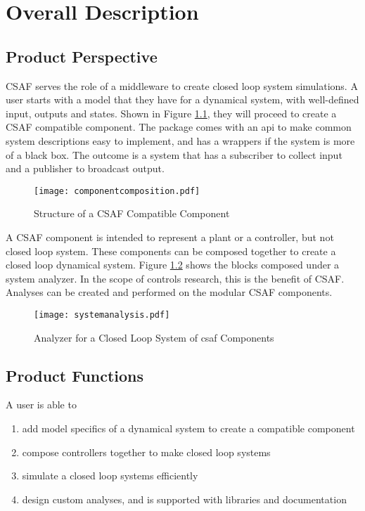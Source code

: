 \chapter{Overall Description}

\section{Product Perspective}

CSAF serves the role of a middleware to create closed loop system simulations. A user starts with a model that they have for a dynamical system, with well-defined input, outputs and states. Shown in Figure \ref{fig:ccomp}, they will proceed to create a CSAF compatible component. The package comes with an \acrshort{api} to make common system descriptions easy to implement, and has a wrappers if the system is more of a black box. The outcome is a system that has a subscriber to collect input and a publisher to broadcast output. \\

\begin{figure}
\centering
\texttt{[image: componentcomposition.pdf]}
\caption{Structure of a CSAF Compatible Component}
\label{fig:ccomp}
\end{figure}

A CSAF component is intended to represent a plant or a controller, but not closed loop system. These components can be composed together to create a closed loop dynamical system. Figure \ref{fig:csys} shows the blocks composed under a system analyzer. In the scope of controls research, this is the benefit of CSAF. Analyses can be created and performed on the modular CSAF components. \\

\begin{figure}
\centering
\texttt{[image: systemanalysis.pdf]}
\caption{Analyzer for a Closed Loop System of \acrshort{csaf} Components }
\label{fig:csys}
\end{figure}


\section{Product Functions}

A user is able to

\begin{enumerate}
\item add model specifics of a dynamical system to create a compatible component
\item compose controllers together to make closed loop systems
\item simulate a closed loop systems efficiently
\item design custom analyses, and is supported with libraries and documentation
\end{enumerate}

